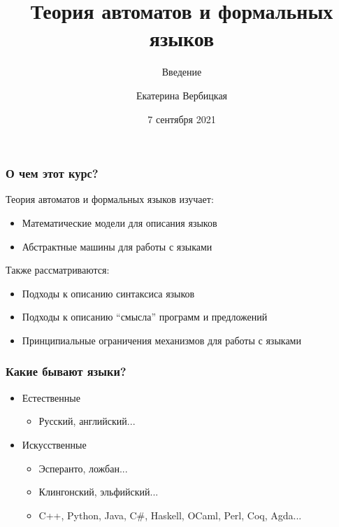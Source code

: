 \documentclass{beamer}
\title[]{Теория автоматов и формальных языков}
\subtitle[]{Введение}
\institute[]{
Санкт-Петербургский государственный электротехнический университет <<ЛЭТИ>>\\
}
\author[]{Екатерина Вербицкая}
\date{7 сентября 2021}
\begin{document}
{
  \begin{frame}
    \titlepage
  \end{frame}
}

\begin{frame}[fragile]
  \transwipe[direction=90]
  \frametitle{О чем этот курс?}
  Теория автоматов и формальных языков изучает:
  \begin{itemize}
    \item Математические модели для описания языков
    \item Абстрактные машины для работы с языками
  \end{itemize}

  Также рассматриваются:
  \begin{itemize}
    \item Подходы к описанию синтаксиса языков
    \item Подходы к описанию ``смысла'' программ и предложений
    \item Принципиальные ограничения механизмов для работы с языками
  \end{itemize}
\end{frame}

\begin{frame}[fragile]
  \transwipe[direction=90]
  \frametitle{Какие бывают языки?}
  \pause
  \begin{itemize}
    \item Естественные
    \begin{itemize}
      \item Русский, английский...
    \end{itemize}
    \pause
    \item Искусственные
    \begin{itemize}
      \item Эсперанто, ложбан...
      \item Клингонский, эльфийский...
      \pause
      \item C++, Python, Java, C\#, Haskell, OCaml, Perl, Coq, Agda...
    \end{itemize}
  \end{itemize}
\end{frame}
\end{document}
